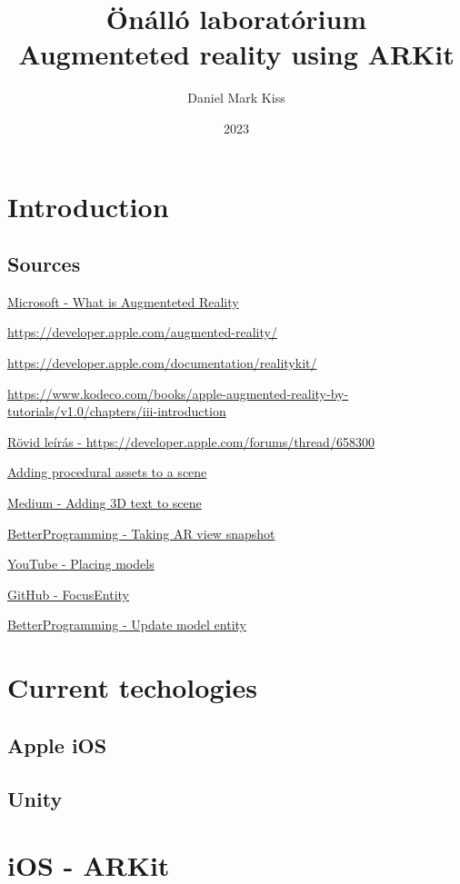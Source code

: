 \documentclass{report}
\title{\Huge{Önálló laboratórium}\\Augmenteted reality using ARKit}
\author{\huge{Daniel Mark Kiss}}
\date{2023}
\begin{document}
\maketitle
\newpage
\tableofcontents
\pagebreak

\chapter{Introduction}
\section{Sources}

\hyperlink{https://dynamics.microsoft.com/en-us/mixed-reality/guides/what-is-augmented-reality-ar/}{Microsoft - What is Augmenteted Reality}

\hyperlink{https://developer.apple.com/augmented-reality/}{https://developer.apple.com/augmented-reality/}

\hyperlink{https://developer.apple.com/documentation/realitykit/}{https://developer.apple.com/documentation/realitykit/}

\hyperlink{https://www.kodeco.com/books/apple-augmented-reality-by-tutorials/v1.0/chapters/iii-introduction}{https://www.kodeco.com/books/apple-augmented-reality-by-tutorials/v1.0/chapters/iii-introduction}

\hyperlink{https://developer.apple.com/forums/thread/658300}{Rövid leírás - https://developer.apple.com/forums/thread/658300}

\hyperlink{https://developer.apple.com/documentation/realitykit/adding-procedural-assets-to-a-scene}{Adding procedural assets to a scene}

\hyperlink{https://coledennis.medium.com/tutorial-generating-3d-text-with-realitykit-in-a-swiftui-app-fa2a50403012}{Medium - Adding 3D text to scene}

\hyperlink{https://betterprogramming.pub/take-an-arview-snapshot-in-realitykit-93b620cf99b3}{BetterProgramming - Taking AR view snapshot}

\hyperlink{https://www.youtube.com/watch?v=9R_G0EI-UoI}{YouTube - Placing models}

\hyperlink{https://github.com/maxxfrazer/FocusEntity}{GitHub - FocusEntity}

\hyperlink{https://betterprogramming.pub/how-to-add-text-to-an-arview-in-an-ios-application-tutorial-f3f746f4dc1f}{BetterProgramming - Update model entity}

\chapter{Current techologies}

\section{Apple iOS}

\section{Unity}

\chapter{iOS - ARKit}
\end{document}

